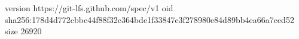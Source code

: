 version https://git-lfs.github.com/spec/v1
oid sha256:178d4d772cbbc44f88f32c364bde1f33847e3f278980e84d89bb4ea66a7eed52
size 26920
